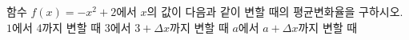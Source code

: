 함수 $f(x)=-x^2+2$에서 $x$의 값이 다음과 같이 변할 때의 평균변화율을 구하시오.
 $1$에서 $4$까지 변할 때
 $3$에서 $3+\varDelta x$까지 변할 때
 $a$에서 $a+\varDelta x$까지 변할 때
